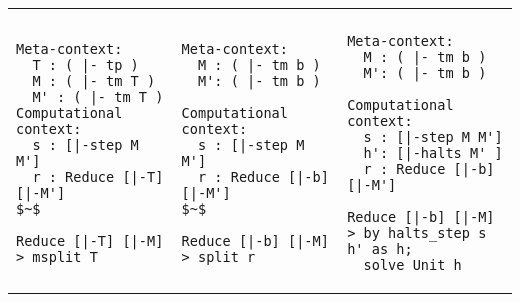 \NextHarpoonProof
\centering

\newcommand{\cwidthOne}{0.33\textwidth}
\newcommand{\cwidthTwo}{0.33\textwidth}
\newcommand{\cwidthThree}{0.34\textwidth}

\newenvironment{eventable}{%
  \begin{tabular}{p{\cwidthOne}|p{\cwidthTwo}|p{\cwidthThree}}%
    }{%
  \end{tabular}
}

\begin{eventable}
  \step{bwd:msplit-T} & \step{bwd:b-invert-r} & \step{bwd:b-solve} \tabularnewline

\begin{lstlisting}
Meta-context:
  T : ( |- tp )
  M : ( |- tm T )
  M' : ( |- tm T )
Computational context:
  s : [|-step M M']
  r : Reduce [|-T] [|-M']
$~$
\end{lstlisting}


\begin{lstlisting}
Reduce [|-T] [|-M]
> msplit T
\end{lstlisting}
  &

\begin{lstlisting}
Meta-context:
  M : ( |- tm b )
  M': ( |- tm b )

Computational context:
  s : [|-step M M']
  r : Reduce [|-b] [|-M']
$~$
\end{lstlisting}


\begin{lstlisting}
Reduce [|-b] [|-M]
> split r
\end{lstlisting}
&
\begin{lstlisting}
Meta-context:
  M : ( |- tm b )
  M': ( |- tm b )

Computational context:
  s : [|-step M M']
  h': [|-halts M' ]
  r : Reduce [|-b] [|-M']
\end{lstlisting}
\begin{lstlisting}
Reduce [|-b] [|-M]
> by halts_step s h' as h; 
  solve Unit h
\end{lstlisting}
\end{eventable}



\caption{%
  Backwards closed lemma. Step 1: Case analysis of the type
  \lstinline!T!; Steps 2 and 3: Base case (\lstinline!T!~$=$~\lstinline!b!).
}
\label{fig:bwd-closed-harpoon}

